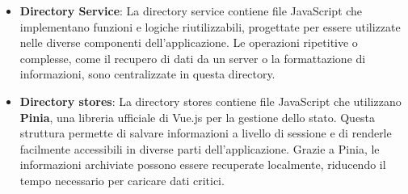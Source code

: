 \begin{itemize}
	\item \textbf{Directory Service}: La directory service contiene file JavaScript che implementano funzioni e logiche riutilizzabili, progettate per essere utilizzate nelle diverse componenti dell’applicazione. Le operazioni ripetitive o complesse, come il recupero di dati da un server o la formattazione di informazioni, sono centralizzate in questa directory.
	
	\item \textbf{Directory stores}: La directory stores contiene file JavaScript che utilizzano \textbf{Pinia}, una libreria ufficiale di Vue.js per la gestione dello stato. Questa struttura permette di salvare informazioni a livello di sessione e di renderle facilmente accessibili in diverse parti dell’applicazione. Grazie a Pinia, le informazioni archiviate possono essere recuperate localmente, riducendo il tempo necessario per caricare dati critici.
	
\end{itemize}